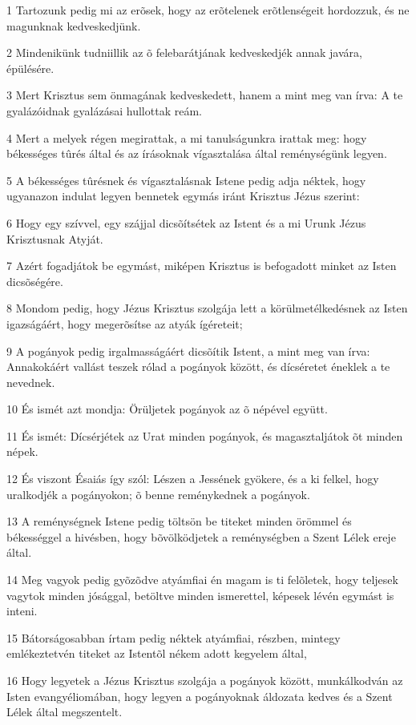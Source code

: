 \par 1 Tartozunk pedig mi az erõsek, hogy az erõtelenek erõtlenségeit hordozzuk, és ne magunknak kedveskedjünk.
\par 2 Mindenikünk tudniillik az õ felebarátjának kedveskedjék annak javára, épülésére.
\par 3 Mert Krisztus sem önmagának kedveskedett, hanem a mint meg van írva: A te gyalázóidnak gyalázásai hullottak reám.
\par 4 Mert a melyek régen megirattak, a mi tanulságunkra irattak meg: hogy békességes tûrés által és az írásoknak vígasztalása által reménységünk legyen.
\par 5 A békességes tûrésnek és vígasztalásnak Istene pedig adja néktek, hogy ugyanazon indulat legyen bennetek egymás iránt Krisztus Jézus szerint:
\par 6 Hogy egy szívvel, egy szájjal dicsõítsétek az Istent és a mi Urunk Jézus Krisztusnak Atyját.
\par 7 Azért fogadjátok be egymást, miképen Krisztus is befogadott minket az Isten dicsõségére.
\par 8 Mondom pedig, hogy Jézus Krisztus szolgája lett a körülmetélkedésnek az Isten igazságáért, hogy megerõsítse az atyák  ígéreteit;
\par 9 A pogányok pedig irgalmasságáért dicsõítik Istent, a mint meg van írva: Annakokáért vallást teszek rólad a pogányok között, és dícséretet éneklek a te nevednek.
\par 10 És ismét azt mondja: Örüljetek pogányok az õ népével együtt.
\par 11 És ismét: Dícsérjétek az Urat minden pogányok, és magasztaljátok õt minden népek.
\par 12 És viszont Ésaiás így szól: Lészen a Jessének gyökere, és a ki felkel, hogy uralkodjék a pogányokon; õ benne reménykednek a pogányok.
\par 13 A reménységnek Istene pedig töltsön be titeket minden örömmel és békességgel a hivésben, hogy bõvölködjetek a reménységben a Szent Lélek ereje által.
\par 14 Meg vagyok pedig gyõzõdve atyámfiai én magam is ti felõletek, hogy teljesek vagytok minden jósággal, betöltve minden ismerettel, képesek lévén egymást is inteni.
\par 15 Bátorságosabban írtam pedig néktek atyámfiai, részben, mintegy emlékeztetvén titeket az Istentõl nékem adott kegyelem által,
\par 16 Hogy legyetek a Jézus Krisztus szolgája a pogányok között, munkálkodván az Isten evangyéliomában, hogy legyen a pogányoknak áldozata kedves és a Szent Lélek által megszentelt.
